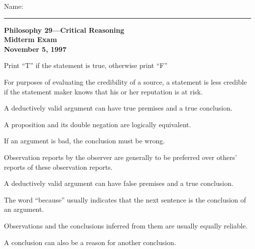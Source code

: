 \documentclass{examdesign}
\begin{document}
\begin{examtop}
  \noindent Name:\rule{4in}{.4pt}
  \begin{center}
    \textbf{Philosophy 29---Critical Reasoning} \\
    \textbf{Midterm Exam } \\
    \textbf{November 5, 1997}
  \end{center}
\end{examtop}

\begin{truefalse}[title={True/False (2 pts. each)},suppressprefix]
Print ``T'' if the statement is true, otherwise print ``F''
\begin{question}
   For purposes of evaluating the credibility of a source, a
  statement is less credible if the statement maker knows that his or her
  reputation is at risk.
\end{question}

\begin{question}
   A deductively valid argument can have true premises and a true
  conclusion.
\end{question}

\begin{question}
   A proposition and its double negation are logically equivalent.
\end{question}

\begin{question}
   If an argument is bad, the conclusion must be wrong.
\end{question}

\begin{question}
   Observation reports by the observer are generally to be
  preferred over others' reports of these observation reports.
\end{question}

\begin{question}
   A deductively valid argument can have false premises and a true conclusion.
\end{question}

\begin{question}
   The word ``because'' usually indicates that the next sentence
  is the conclusion of an argument.
\end{question}

\begin{question}
   Observations and the conclusions inferred from them are
  usually equally reliable.
\end{question}

\begin{question}
   A conclusion can also be a reason for another conclusion.
\end{question}
\end{truefalse}
\end{document}
